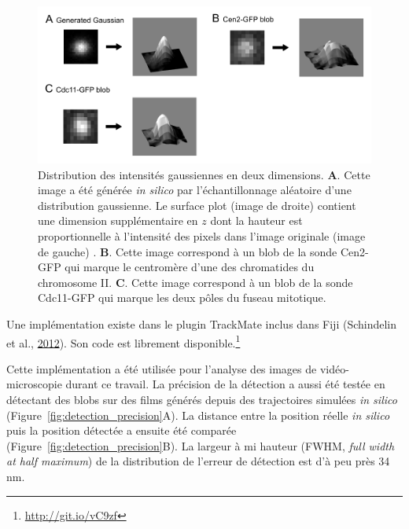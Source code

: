\documentclass[12pt,a4paper,twoside,openright]{book}
\begin{document}
\begin{figure}[htbp]
\centering
\includegraphics{figures/results/imaging/gaussian.png}
\caption[Distribution des intensités gaussiennes en deux dimensions]{\label{fig:gaussian}Distribution
des intensités gaussiennes en deux dimensions. \textbf{A}. Cette image a
été générée \emph{in silico} par l'échantillonnage aléatoire d'une
distribution gaussienne. Le surface plot (image de droite) contient une
dimension supplémentaire en \(z\) dont la hauteur est proportionnelle à
l'intensité des pixels dans l'image originale (image de gauche) .
\textbf{B}. Cette image correspond à un blob de la sonde Cen2-GFP qui
marque le centromère d'une des chromatides du chromosome II. \textbf{C}.
Cette image correspond à un blob de la sonde Cdc11-GFP qui marque les
deux pôles du fuseau mitotique.}
\end{figure}

Une implémentation existe dans le plugin TrackMate inclus dans Fiji
(Schindelin et al., \protect\hyperlink{ref-Schindelin2012}{2012}). Son
code est librement disponible.\footnote{\url{http://git.io/vC9zf}}

Cette implémentation a été utilisée pour l'analyse des images de
vidéo-microscopie durant ce travail. La précision de la détection a
aussi été testée en détectant des blobs sur des films générés depuis des
trajectoires simulées \emph{in silico}
(Figure~\ref{fig:detection_precision}A). La distance entre la position
réelle \emph{in silico} puis la position détectée a ensuite été comparée
(Figure~\ref{fig:detection_precision}B). La largeur à mi hauteur (FWHM,
\emph{full width at half maximum}) de la distribution de l'erreur de
détection est d'à peu près 34 nm.
\end{document}
